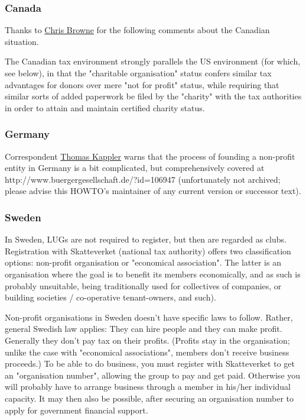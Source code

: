 \subsubsection{Canada}

Thanks to \ifpdf
\href{mailto:cbbrowne@cbbrowne.com}{Chris Browne}%
\else
{}%
\fi{}
 for the following comments about the Canadian situation.



The Canadian tax environment strongly parallels the US environment (for which,
see below), in that the "charitable organisation" status confers similar tax
advantages for donors over mere "not for profit" status, while
requiring that similar sorts of added paperwork be filed by the
"charity" with the tax authorities in order to attain and maintain
certified charity status.




\subsubsection{Germany}

Correspondent \ifpdf
\href{mailto:Thomas.Kappler@stud.uni-karlsruhe.de}{Thomas Kappler}%
\else
{}%
\fi{}
 warns that the process of founding a non-profit entity in Germany
is a bit complicated, but comprehensively covered at 
http://www.buergergesellschaft.de/?id=106947 (unfortunately not archived; please
advise this HOWTO's maintainer of any current version or successor text).




\subsubsection{Sweden}

In Sweden, LUGs are not required to register, but then are regarded as 
clubs.  Registration with Skatteverket (national tax authority) offers 
two classification options:  non-profit organisation or "economical 
association". The latter is an organisation where the goal is to benefit 
its members economically, and as such is probably unsuitable, being 
traditionally used for collectives of companies, or building societies 
/ co-operative tenant-owners, and such).

Non-profit organisations in Sweden doesn't have specific laws to follow. 
Rather, general Swedish law applies: They can hire people and they can 
make profit. Generally they don't pay tax on their profits. (Profits 
stay in the organisation; unlike the case with "economical associations", 
members don't receive business proceeds.) To be able to do business, you
must register with Skatteverket to get an "organisation number", allowing 
the group to pay and get paid. Otherwise you will probably have to 
arrange business through a member in his/her individual capacity.  
It may then also be possible, after securing an organisation number to 
apply for government financial support.




